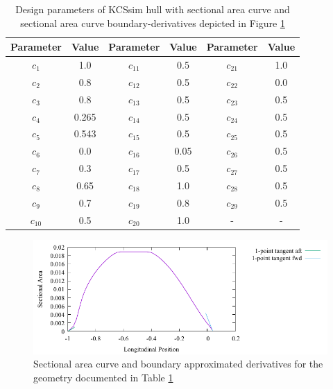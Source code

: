 \documentclass{report}
\begin{document}
\begin{table}[H]
    \centering
    \begin{tabular}{|c|c|c|c|c|c|}
        \hline 
        Parameter & Value & Parameter & Value & Parameter & Value\\
        \hline 
        $c_1$ & 1.0 & $c_{11}$ & 0.5 & $c_{21}$ & 1.0 \\
        \hline 
        $c_2$ & 0.8 & $c_{12}$ & 0.5 & $c_{22}$ & 0.0\\
        \hline 
        $c_3$ & 0.8 & $c_{13}$ & 0.5 & $c_{23}$ & 0.5 \\
        \hline 
        $c_4$ & 0.265 & $c_{14}$ & 0.5 & $c_{24}$ & 0.5 \\
        \hline 
        $c_5$ & 0.543 & $c_{15}$ & 0.5 & $c_{25}$ & 0.5 \\
        \hline 
        $c_6$ & 0.0 & $c_{16}$ & 0.05 & $c_{26}$ & 0.5 \\
        \hline 
        $c_7$ & 0.3 & $c_{17}$ & 0.5 & $c_{27}$ & 0.5 \\
        \hline 
        $c_8$ & 0.65 & $c_{18}$ & {\color{blue} 1.0} & $c_{28}$ & 0.5 \\
        \hline 
        $c_9$ & 0.7 & $c_{19}$ & 0.8 & $c_{29}$ & 0.5 \\
        \hline 
        $c_{10}$ & 0.5 & $c_{20}$ & 1.0 & - & - \\
        \hline 
    \end{tabular}
    \caption{Design parameters of KCSsim hull with sectional area curve and 
    sectional area curve boundary-derivatives depicted in Figure
    \ref{fig:test-4-sac-2}}
    \label{tab:test-4-2}
\end{table}
\begin{figure}[H]
    \centering
    \includegraphics[width = 0.7\linewidth]{figures/test-4-sac-2.pdf}
    \caption{Sectional area curve and boundary approximated derivatives for
    the geometry documented in Table \ref{tab:test-4-2}}
    \label{fig:test-4-sac-2}
\end{figure}
\end{document}
